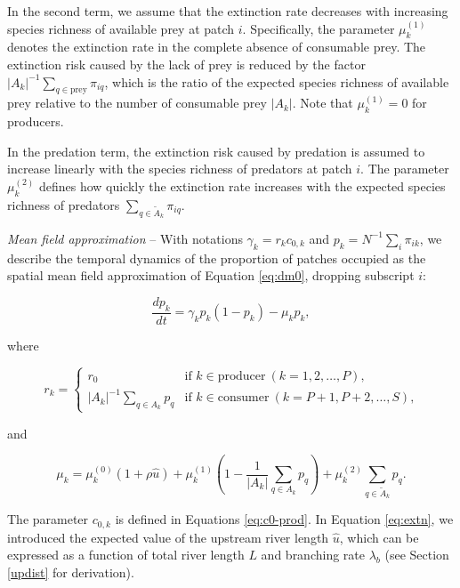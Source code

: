 \documentclass[11pt, class=article, crop=false]{standalone}
\theoremstyle{definition}
\begin{document}
In the second term, we assume that the extinction rate decreases with increasing species richness of available prey at patch $i$.
Specifically, the parameter $\mu_{k}^{(1)}$ denotes the extinction rate in the complete absence of consumable prey.
The extinction risk caused by the lack of prey is reduced by the factor $|A_k|^{-1} \sum_{q \in \text{prey}} \pi_{iq}$, which is the ratio of the expected species richness of available prey relative to the number of consumable prey $|A_k|$.
Note that $\mu_{k}^{(1)} = 0$ for producers.

In the predation term, the extinction risk caused by predation is assumed to increase linearly with the species richness of predators at patch $i$.
The parameter $\mu_{k}^{(2)}$ defines how quickly the extinction rate increases with the expected species richness of predators $\sum_{q \in \tilde{A}_k} \pi_{iq}$.

\textit{Mean field approximation} --
With notations $\gamma_k = r_{k} c_{0, k}$ and $p_k = N^{-1} \sum_i \pi_{ik}$, we describe the temporal dynamics of the proportion of patches occupied as the spatial mean field approximation of Equation \ref{eq:dm0}, dropping subscript $i$:

\begin{equation}
    \frac{dp_k}{dt} = \gamma_k p_{k} (1 - p_{k}) - \mu_{k} p_{k},
    \label{eq:master}
\end{equation}

where

\begin{equation}
    r_{k} = 
    \begin{cases}
        r_0 & \text{if $k \in \text{producer}~(k = 1, 2, \ldots, P)$,}\\
        |A_k|^{-1} \sum_{q \in A_k} p_{q} & \text{if $k \in \text{consumer}~(k = P + 1, P + 2, \ldots, S)$,}
    \end{cases}
\end{equation}

and

\begin{equation}
    \mu_{k} = 
        \mu_{k}^{(0)} (1 + \rho \hat{u}) + 
        \mu_{k}^{(1)} \left(1 - \frac{1}{|A_k|}\sum_{q \in A_k} p_{q} \right) + 
        \mu_{k}^{(2)} \sum_{q \in \tilde{A}_k} p_{q}.
    \label{eq:extn}    
\end{equation}

The parameter $c_{0, k}$ is defined in Equations \ref{eq:c0-prod}. 
In Equation \ref{eq:extn}, we introduced the expected value of the upstream river length $\hat{u}$, which can be expressed as a function of total river length $L$ and branching rate $\lambda_b$ (see Section \ref{updist} for derivation).
\end{document}
